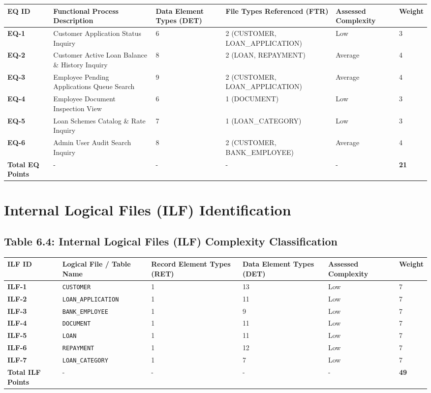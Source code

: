 \documentclass[12pt,a4paper,oneside]{report}
\begin{document}
\begin{table}[htbp]
\centering
\small
\begin{tabularx}{\textwidth}{p{2.5cm} X X X X X}
\toprule
\textbf{EQ ID} & \textbf{Functional Process Description} & \textbf{Data Element Types (DET)} & \textbf{File Types Referenced (FTR)} & \textbf{Assessed Complexity} & \textbf{Weight} \\
\midrule
\textbf{EQ-1} & Customer Application Status Inquiry & 6 & 2 (CUSTOMER, LOAN\_APPLICATION) & Low & 3 \\
\textbf{EQ-2} & Customer Active Loan Balance \& History Inquiry & 8 & 2 (LOAN, REPAYMENT) & Average & 4 \\
\textbf{EQ-3} & Employee Pending Applications Queue Search & 9 & 2 (CUSTOMER, LOAN\_APPLICATION) & Average & 4 \\
\textbf{EQ-4} & Employee Document Inspection View & 6 & 1 (DOCUMENT) & Low & 3 \\
\textbf{EQ-5} & Loan Schemes Catalog \& Rate Inquiry & 7 & 1 (LOAN\_CATEGORY) & Low & 3 \\
\textbf{EQ-6} & Admin User Audit Search Inquiry & 8 & 2 (CUSTOMER, BANK\_EMPLOYEE) & Average & 4 \\
\textbf{Total EQ Points} & - & - & - & - & \textbf{21} \\
\bottomrule
\end{tabularx}
\end{table}

\section{Internal Logical Files (ILF) Identification}

\subsection{Table 6.4: Internal Logical Files (ILF) Complexity Classification}

\begin{table}[htbp]
\centering
\small
\begin{tabularx}{\textwidth}{p{2.5cm} X X X X X}
\toprule
\textbf{ILF ID} & \textbf{Logical File / Table Name} & \textbf{Record Element Types (RET)} & \textbf{Data Element Types (DET)} & \textbf{Assessed Complexity} & \textbf{Weight} \\
\midrule
\textbf{ILF-1} & \texttt{CUSTOMER} & 1 & 13 & Low & 7 \\
\textbf{ILF-2} & \texttt{LOAN\_APPLICATION} & 1 & 11 & Low & 7 \\
\textbf{ILF-3} & \texttt{BANK\_EMPLOYEE} & 1 & 9 & Low & 7 \\
\textbf{ILF-4} & \texttt{DOCUMENT} & 1 & 11 & Low & 7 \\
\textbf{ILF-5} & \texttt{LOAN} & 1 & 11 & Low & 7 \\
\textbf{ILF-6} & \texttt{REPAYMENT} & 1 & 12 & Low & 7 \\
\textbf{ILF-7} & \texttt{LOAN\_CATEGORY} & 1 & 7 & Low & 7 \\
\textbf{Total ILF Points} & - & - & - & - & \textbf{49} \\
\bottomrule
\end{tabularx}
\end{table}
\end{document}
